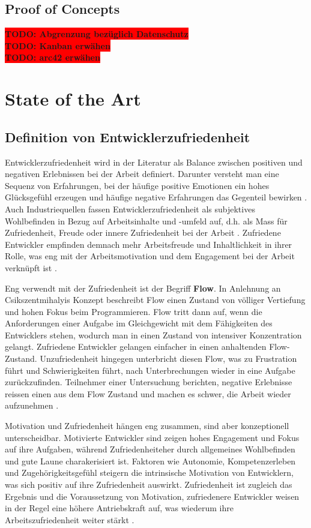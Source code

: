 \documentclass[12pt,a4paper]{report}
\newcommand{\todo}[1]{\colorbox{red}{\textbf{TODO: #1}}\\}
\begin{document}
\section{Proof of Concepts}
\todo{Abgrenzung bezüglich Datenschutz}
\todo{Kanban erwähen}
\todo{arc42 erwähen}

\chapter{State of the Art}
\section{Definition von Entwicklerzufriedenheit}

Entwicklerzufriedenheit wird in der Literatur als Balance zwischen positiven und negativen Erlebnissen bei der
Arbeit definiert. Darunter versteht man eine Sequenz von Erfahrungen, bei der häufige positive Emotionen ein
hohes Glücksgefühl erzeugen und häufige negative Erfahrungen das Gegenteil bewirken \cite{sadowski_happiness_2019}.
Auch Industriequellen fassen Entwicklerzufriedenheit als subjektives Wohlbefinden in Bezug auf Arbeitsinhalte
und -umfeld auf, d.h. als Mass für Zufriedenheit, Freude oder innere Zufriedenheit bei der Arbeit \cite{zenhub_2022_nodate}.
Zufriedene Entwickler empfinden demnach mehr Arbeitsfreude und Inhaltlichkeit in ihrer Rolle, was eng mit
der Arbeitsmotivation und dem Engagement bei der Arbeit verknüpft ist \cite{franca_motivation_2020}.

Eng verwendt mit der Zufriedenheit ist der Begriff \textbf{Flow}. In Anlehnung an Csikszentmihalyis Konzept beschreibt
Flow einen Zustand von völliger Vertiefung und hohen Fokus beim Programmieren. Flow tritt dann auf, wenn die Anforderungen
einer Aufgabe im Gleichgewicht mit dem Fähigkeiten des Entwicklers stehen, wodurch man in einen Zustand von intensiver 
Konzentration gelangt. Zufriedene Entwickler gelangen einfacher in einen anhaltenden Flow-Zustand. Unzufriedenheit
hingegen unterbricht diesen Flow, was zu Frustration führt und Schwierigkeiten führt, nach Unterbrechungen wieder in
eine Aufgabe zurückzufinden. Teilnehmer einer Untersuchung berichten, negative Erlebnisse reissen einen aus dem Flow
Zustand und machen es schwer, die Arbeit wieder aufzunehmen \cite{sadowski_happiness_2019}.

Motivation und Zufriedenheit hängen eng zusammen, sind aber konzeptionell unterscheidbar. Motivierte Entwickler sind
zeigen hohes Engagement und Fokus auf ihre Aufgaben, während Zufriedenheiteher durch allgemeines Wohlbefinden und gute
Laune charakerisiert ist. Faktoren wie Autonomie, Kompetenzerleben und Zugehörigkeitsgefühl steigern die intrinsische 
Motivation von Entwicklern, was sich positiv auf ihre Zufriedenheit auswirkt. Zufriedenheit ist zugleich das Ergebnis und
die Voraussetzung von Motivation, zufriedenere Entwickler weisen in der Regel eine höhere Antriebskraft auf, was wiederum ihre
Arbeitszufriedenheit weiter stärkt \cite{franca_motivation_2020}.
\end{document}
